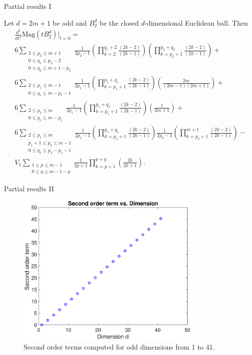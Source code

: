 \documentclass[12pt,mathserif]{beamer}
\begin{document}
\begin{frame}[shrink]{Partial results I}

Let $d=2m+1$ be odd and $B_2^d$ be the closed $d$-dimensional Euclidean ball. Then
\begin{align*}
&\frac{d^2}{dt^2}\text{Mag}(tB_2^d)\big\vert_{t=0} = \\
&6\sum\limits_{\substack{2\leq p_2\leq m+1 \\ 0\leq q_1 \leq p_2-2 \\ 0\leq q_2 \leq m+1-p_2}}\frac{1}{2p_2-1}\left(\prod\limits_{k=2}^{q_1+2}\frac{(2k-2)}{(2k-1)}\right)\left(\prod\limits_{k=p_2+1}^{p_2+q_2}\frac{(2k-2)}{(2k-1)}\right) + \\
&6\sum\limits_{\substack{2\leq p_1\leq m-1 \\ 0\leq q_1\leq m-p_1-1}}\frac{1}{2p_1-1}\left(\prod\limits_{k=p_1+1}^{p_1+q_1}\frac{(2k-2)}{(2k-1)}\right)\left(\frac{2m}{(2m-1)(2m+1)}\right) + \\
&6\sum\limits_{\substack{2\leq p_1\leq m \\ 0\leq q_1\leq m-p_1}}\frac{1}{2p_1-1}\left(\prod\limits_{k=p_1+1}^{p_1+q_1}\frac{(2k-2)}{(2k-1)}\right)\left(\frac{1}{2m+1}\right) + \\
&6\sum\limits_{\substack{2\leq p_1\leq m \\ p_1+1\leq p_2 \leq m-1 \\ 0\leq q_1\leq p_2-p_1-1 }}\frac{1}{2p_1-1}\left(\prod\limits_{k=p_1+1}^{p_1+q_1}\frac{(2k-2)}{(2k-1)}\right)\frac{1}{2p_2-1}\left(\prod\limits_{k=p_2+1}^{m+1}\frac{(2k-2)}{(2k-1)}\right) - \\
&V_{1}\sum\limits_{\substack{1\leq p \leq m-1 \\ 0 \leq q \leq m - 1 - p}}\frac{1}{2p+1}\prod\limits_{k=p+1}^{p+q}\left(\frac{2k}{2k+1}\right).
\end{align*}

\end{frame}

\begin{frame}{Partial results II}
\begin{figure}
\centerline{\includegraphics[width=9cm]{secs.eps}}\caption{\label{fig:secondsplot} Second order terms computed for odd dimensions from 1 to 41.}
\end{figure}
\end{frame}
\end{document}
